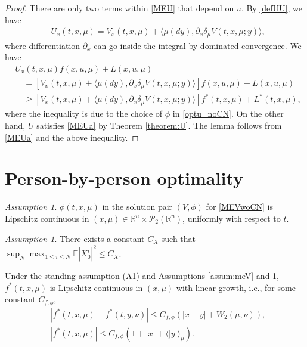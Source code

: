\documentclass{amsart}
\theoremstyle{definition}
\theoremstyle{remark}
\newtheorem{assumption}[theorem]{Assumption}
\def\cal{\mathcal}
\def\EE{{\mathbb E}}
\numberwithin{equation}{section}
\begin{document}
\begin{proof}
There are only two  terms within \eqref{MEU} that depend on $u$.
By \eqref{defUU}, we have
\begin{align}
&U_x(t, x, \mu)= V_x(t,x,\mu) + \langle \mu(dy) , \partial_x\delta_\mu V (t, x, \mu;y)\rangle,
\end{align}
where differentiation $\partial_x  $ can go inside the integral by dominated convergence.
 We have
\begin{align*}
& U_x(t,x,\mu) f(x, u, \mu)+L(x,u,\mu)\\
& \quad =[ V_x(t,x,\mu) + \langle \mu(dy) , \partial_x\delta_\mu V (t, x, \mu;y)\rangle ]f(x,u,\mu)  +L(x,u,\mu)  \\
&\quad \ge [ V_x(t,x,\mu) + \langle \mu(dy) , \partial_x\delta_\mu V (t, x, \mu;y)\rangle ]f^*(t,x,\mu)
  +L^*(t,x,\mu),
\end{align*}
where the inequality is due to the choice of $\phi$ in \eqref{optu_noCN}. On the other hand, $U$ satisfies \eqref{MEUa} by Theorem \ref{theorem:U}.
The lemma follows from \eqref{MEUa} and the above inequality.
\end{proof}







\section{Person-by-person optimality}
\label{sec:PO}

\begin{assumption} \label{assum:Lip}
$\phi(t, x, \mu)$ in the solution pair $(V, \phi)$ for \eqref{MEVwoCN} is  Lipschitz continuous in $(x, \mu)\in\mathbb{R}^n\times {\cal P}_2(\mathbb{R}^n)$,
 uniformly with respect to $t$.
\end{assumption}


\begin{assumption}\label{assum:X0}
There exists a constant $C_X$ such that
$\sup_N \max_{1\le i\le N} \EE| X_0^i|^2
\le C_X$.
\end{assumption}



Under the standing assumption (A1) and Assumptions \ref{assum:meV} and \ref{assum:Lip},  $f^*(t, x, \mu)$ is Lipschitz continuous in $(x, \mu)$ with linear growth, i.e., for some constant $C_{f,\phi}$,
\begin{align}
&|f^*(t,x, \mu)-f^*(t,y,\nu)|\le C_{f,\phi}(|x-y|+W_2(\mu, \nu)), \label{fLipC} \\
&|f^*(t,x, \mu)|\le C_{f,\phi} (1+|x|+\langle|y| \rangle_\mu).
\end{align}
\end{document}
